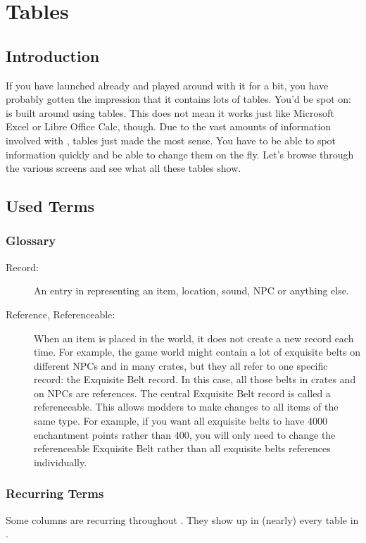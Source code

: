 \section{Tables}

\subsection{Introduction}
If you have launched \OCS{} already and played around with it for a bit, you have probably gotten the impression that it contains lots of tables.
You'd be spot on: \OCS{} is built around using tables. This does not mean it works just like Microsoft Excel or Libre Office Calc, though. 
Due to the vast amounts of information involved with \MW, tables just made the most sense. You have to be able to spot information quickly
and be able to change them on the fly.
Let's browse through the various screens and see what all these tables show.

\subsection{Used Terms}

\subsubsection{Glossary}

\begin{description}
 \item[Record:] An entry in \OCS{} representing an item, location, sound, NPC or anything else.

 \item[Reference, Referenceable:] When an item is placed in the world, it does not create a new record each time. For example, the game world might
 contain a lot of exquisite belts on different NPCs and in many crates, but they all refer to one specific record: the Exquisite Belt record.
 In this case, all those belts in crates and on NPCs are references. The central Exquisite Belt record is called a referenceable. This allows modders
 to make changes to all items of the same type. For example, if you want all exquisite belts to have 4000 enchantment points rather than 400, you will
 only need to change the referenceable Exquisite Belt rather than all exquisite belts references individually.
\end{description}

\subsubsection{Recurring Terms}
Some columns are recurring throughout \OCS. They show up in (nearly) every table in \OCS.

